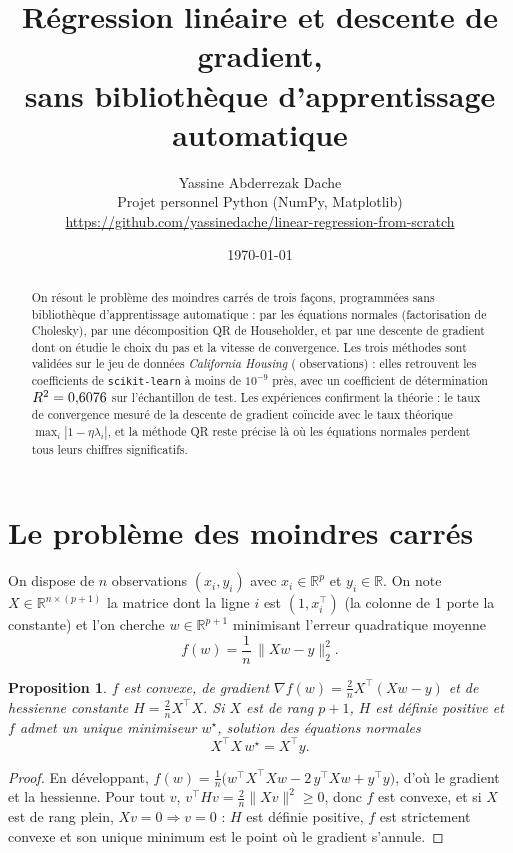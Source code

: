 \documentclass[11pt,a4paper]{article}
\title{\textbf{Régression linéaire et descente de gradient,\\ sans bibliothèque d'apprentissage automatique}}
\author{Yassine Abderrezak Dache\\[2pt]\small Projet personnel \textendash{} Python (NumPy, Matplotlib)\\[1pt]\small\url{https://github.com/yassinedache/linear-regression-from-scratch}}
\date{\today}
\newtheorem{proposition}{Proposition}
\theoremstyle{remark}
\newcommand{\R}{\mathbb{R}}
\begin{document}
\maketitle

\begin{abstract}
On résout le problème des moindres carrés de trois façons, programmées sans bibliothèque d'apprentissage automatique : par les équations normales (factorisation de Cholesky), par une décomposition QR de Householder, et par une descente de gradient dont on étudie le choix du pas et la vitesse de convergence. Les trois méthodes sont validées sur le jeu de données \emph{California Housing} (\nRows{} observations) : elles retrouvent les coefficients de \texttt{scikit-learn} à moins de $10^{-9}$ près, avec un coefficient de détermination $R^2 = 0{,}6076$ sur l'échantillon de test. Les expériences confirment la théorie : le taux de convergence mesuré de la descente de gradient coïncide avec le taux théorique $\max_i |1-\eta\lambda_i|$, et la méthode QR reste précise là où les équations normales perdent tous leurs chiffres significatifs.
\end{abstract}

\section{Le problème des moindres carrés}

On dispose de $n$ observations $(x_i, y_i)$ avec $x_i \in \R^{p}$ et $y_i \in \R$. On note $X \in \R^{n \times (p+1)}$ la matrice dont la ligne $i$ est $(1, x_i^\top)$ (la colonne de 1 porte la constante) et l'on cherche $w \in \R^{p+1}$ minimisant l'erreur quadratique moyenne
\[
  f(w) = \frac{1}{n}\,\lVert Xw - y \rVert_2^2 .
\]

\begin{proposition}\label{prop:normales}
$f$ est convexe, de gradient $\nabla f(w) = \frac{2}{n} X^\top (Xw - y)$ et de hessienne constante $H = \frac{2}{n} X^\top X$. Si $X$ est de rang $p+1$, $H$ est définie positive et $f$ admet un unique minimiseur $w^\star$, solution des \emph{équations normales}
\[
  X^\top X\, w^\star = X^\top y .
\]
\end{proposition}

\begin{proof}
En développant, $f(w) = \frac1n\big(w^\top X^\top X w - 2\, y^\top X w + y^\top y\big)$, d'où le gradient et la hessienne. Pour tout $v$, $v^\top H v = \frac2n \lVert Xv\rVert^2 \ge 0$, donc $f$ est convexe, et si $X$ est de rang plein, $Xv = 0 \Rightarrow v = 0$ : $H$ est définie positive, $f$ est strictement convexe et son unique minimum est le point où le gradient s'annule.
\end{proof}
\end{document}
